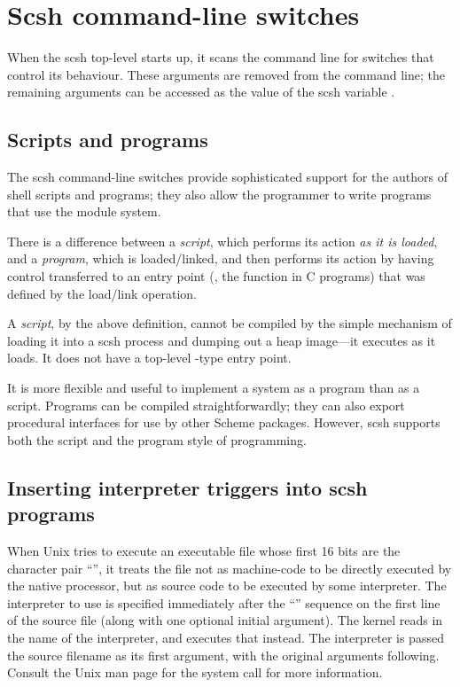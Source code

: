 \section{Scsh command-line switches}

When the scsh top-level starts up, it scans the command line
for switches that control its behaviour.
These arguments are removed from the command line; 
the remaining arguments can be accessed as the value of
the scsh variable .

\subsection{Scripts and programs}

The scsh command-line switches provide sophisticated support for 
the authors of shell scripts and programs;
they also allow the programmer to write programs 
that use the {\scm} module system.

There is a difference between a \emph{script}, which performs its action
\emph{as it is loaded}, and a \emph{program}, which is loaded/linked, 
and then performs its action by having control transferred to an entry point
(\eg, the  function in C programs) that was defined by the
load/link operation.

A \emph{script}, by the above definition, cannot be compiled by the simple
mechanism of loading it into a scsh process and dumping out a heap image---it
executes as it loads. It does not have a top-level -type entry
point.

It is more flexible and useful to implement a system 
as a program than as a script.
Programs can be compiled straightforwardly; 
they can also export procedural interfaces for use by other Scheme packages.
However, scsh supports both the script and the program style of programming.

\subsection{Inserting interpreter triggers into scsh programs}
When Unix tries to execute an executable file whose first 16 bits are
the character pair ``\ex{\#!}'', it treats the file not as machine-code
to be directly executed by the native processor, but as source code to
be executed by some interpreter.
The interpreter to use is specified immediately after the ``\ex{\#!}''
sequence on the first line of the source file 
(along with one optional initial argument).
The kernel reads in the name of the interpreter, and executes that instead.
The interpreter is passed the source filename as its first argument, with
the original arguments following.
Consult the Unix man page for the  system call for more information.

